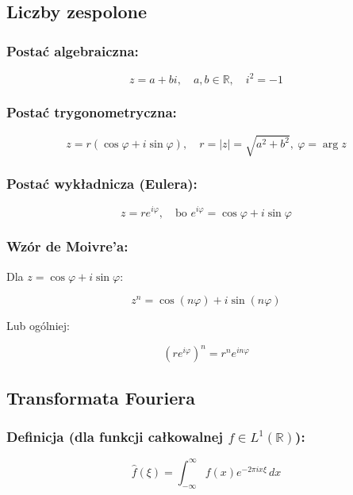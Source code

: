 \subsection{Liczby zespolone}

\subsubsection*{Postać algebraiczna:}

$$
z = a + bi, \quad a, b \in \mathbb{R}, \quad i^2 = -1
$$

\subsubsection*{Postać trygonometryczna:}

$$
z = r(\cos \varphi + i \sin \varphi), \quad r = |z| = \sqrt{a^2 + b^2},\ \varphi = \arg z
$$

\subsubsection*{Postać wykładnicza (Eulera):}

$$
z = re^{i\varphi}, \quad \text{bo } e^{i\varphi} = \cos \varphi + i \sin \varphi
$$

\subsubsection*{Wzór de Moivre'a:}
Dla $z = \cos \varphi + i \sin \varphi$:

$$
z^n = \cos(n\varphi) + i \sin(n\varphi)
$$

Lub ogólniej:

$$
(re^{i\varphi})^n = r^n e^{in\varphi}
$$

\subsection{Transformata Fouriera}

\subsubsection*{Definicja (dla funkcji całkowalnej $f \in L^1(\mathbb{R})$):}

$$
\hat{f}(\xi) = \int_{-\infty}^{\infty} f(x) e^{-2\pi i x \xi} \, dx
$$

